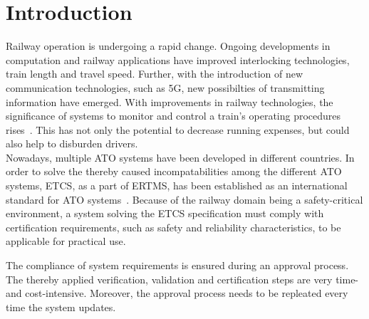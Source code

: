 \chapter{Introduction}

	
Railway operation is undergoing a rapid change.
Ongoing developments in computation and railway applications have improved interlocking technologies, train length and travel speed.
Further, with the introduction of new communication technologies, such as 5G, new possibilties of transmitting information have emerged.
With improvements in railway technologies, the significance of  systems to monitor and control a train's operating procedures rises~\cite{YIN2017RNDofATO}.
This has not only the potential to decrease running expenses, but could also help to disburden drivers.
\\

Nowadays, multiple \gls*{ATO} systems have been developed in different countries.
In order to solve the thereby caused incompatabilities among the different \gls*{ATO} systems, \gls*{ETCS}, as a part of \gls*{ERTMS}, has been established as an international standard for \gls*{ATO} systems~\cite{ETCS26}.
Because of the railway domain being a safety-critical environment, a system solving the \gls*{ETCS} specification must comply with certification requirements, such as safety and reliability characteristics, to be applicable for practical use.

The compliance of system requirements is ensured during an approval process.
The thereby applied verification, validation and certification steps are very time- and cost-intensive.
Moreover, the approval process needs to be repleated every time the system updates.
\\


